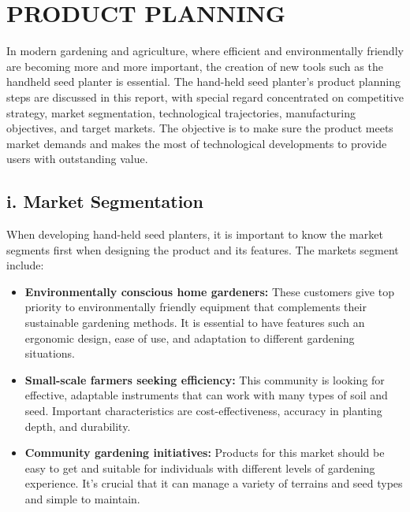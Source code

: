 \section*{PRODUCT PLANNING}
\setcounter{section}{2} %
\addtocounter{section}{1}

In modern gardening and agriculture, where efficient and environmentally friendly are becoming more and more important, the creation of new tools such as the handheld seed planter is essential. The hand-held seed planter's product planning steps are discussed in this report, with special regard concentrated on competitive strategy, market segmentation, technological trajectories, manufacturing objectives, and target markets. The objective is to make sure the product meets market demands and makes the most of technological developments to provide users with outstanding value.

\subsection*{i. Market Segmentation}
When developing hand-held seed planters, it is important to know the market segments first when designing the product and its features. The markets segment include:
\begin{itemize}
    \item \textbf{Environmentally conscious home gardeners:} These customers give top priority to environmentally friendly equipment that complements their sustainable gardening methods. It is essential to have features such an ergonomic design, ease of use, and adaptation to different gardening situations.
    \item \textbf{Small-scale farmers seeking efficiency:} This community is looking for effective, adaptable instruments that can work with many types of soil and seed. Important characteristics are cost-effectiveness, accuracy in planting depth, and durability.
    \item \textbf{Community gardening initiatives:} Products for this market should be easy to get and suitable for individuals with different levels of gardening experience. It's crucial that it can manage a variety of terrains and seed types and simple to maintain.
\end{itemize}

